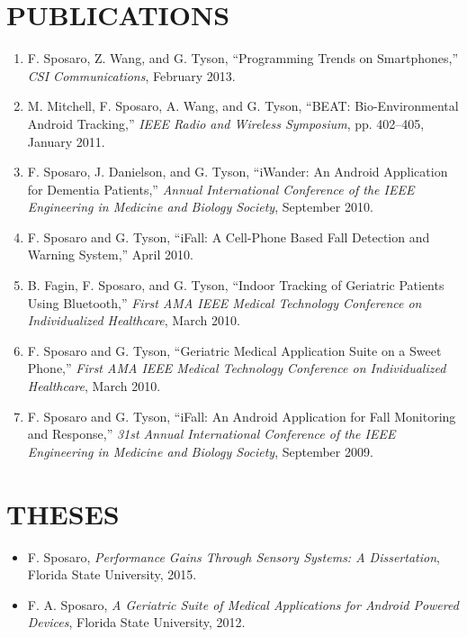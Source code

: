 \documentclass[margin]{res}
\begin{document}
\begin{resume}
\section{PUBLICATIONS}
\begin{enumerate}[leftmargin=*, itemsep=2pt]
  \item F. Sposaro, Z. Wang, and G. Tyson, ``Programming Trends on Smartphones,'' \textit{CSI Communications}, February 2013.
  \item M. Mitchell, F. Sposaro, A. Wang, and G. Tyson, ``BEAT: Bio-Environmental Android Tracking,'' \textit{IEEE Radio and Wireless Symposium}, pp. 402--405, January 2011.
  \item F. Sposaro, J. Danielson, and G. Tyson, ``iWander: An Android Application for Dementia Patients,'' \textit{Annual International Conference of the IEEE Engineering in Medicine and Biology Society}, September 2010.
  \item F. Sposaro and G. Tyson, ``iFall: A Cell-Phone Based Fall Detection and Warning System,'' April 2010.
  \item B. Fagin, F. Sposaro, and G. Tyson, ``Indoor Tracking of Geriatric Patients Using Bluetooth,'' \textit{First AMA IEEE Medical Technology Conference on Individualized Healthcare}, March 2010.
  \item F. Sposaro and G. Tyson, ``Geriatric Medical Application Suite on a Sweet Phone,'' \textit{First AMA IEEE Medical Technology Conference on Individualized Healthcare}, March 2010.
  \item F. Sposaro and G. Tyson, ``iFall: An Android Application for Fall Monitoring and Response,'' \textit{31st Annual International Conference of the IEEE Engineering in Medicine and Biology Society}, September 2009.
\end{enumerate}

\section{THESES}
\begin{itemize}[itemsep=2pt]
  \item F. Sposaro, \textit{Performance Gains Through Sensory Systems: A Dissertation}, Florida State University, 2015.
  \item F. A. Sposaro, \textit{A Geriatric Suite of Medical Applications for Android Powered Devices}, Florida State University, 2012.
\end{itemize}


\end{resume}
\end{document}
